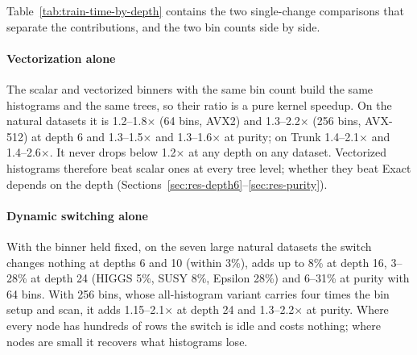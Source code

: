\documentclass[sigconf,anonymous,review]{acmart}
\begin{document}
Table~\ref{tab:train-time-by-depth} contains the two single-change comparisons that separate the contributions, and the two bin counts side by side.

\paragraph{Vectorization alone} The scalar and vectorized binners with the same bin count build the same histograms and the same trees, so their ratio is a pure kernel speedup. On the natural datasets it is 1.2--1.8$\times$ (64 bins, AVX2) and 1.3--2.2$\times$ (256 bins, AVX-512) at depth 6 and 1.3--1.5$\times$ and 1.3--1.6$\times$ at purity; on Trunk 1.4--2.1$\times$ and 1.4--2.6$\times$. It never drops below 1.2$\times$ at any depth on any dataset. Vectorized histograms therefore beat scalar ones at every tree level; whether they beat Exact depends on the depth (Sections~\ref{sec:res-depth6}--\ref{sec:res-purity}).

\paragraph{Dynamic switching alone} With the binner held fixed, on the seven large natural datasets the switch changes nothing at depths 6 and 10 (within 3\%), adds up to 8\% at depth 16, 3--28\% at depth 24 (HIGGS 5\%, SUSY 8\%, Epsilon 28\%) and 6--31\% at purity with 64 bins. With 256 bins, whose all-histogram variant carries four times the bin setup and scan, it adds 1.15--2.1$\times$ at depth 24 and 1.3--2.2$\times$ at purity. Where every node has hundreds of rows the switch is idle and costs nothing; where nodes are small it recovers what histograms lose.

\end{document}
